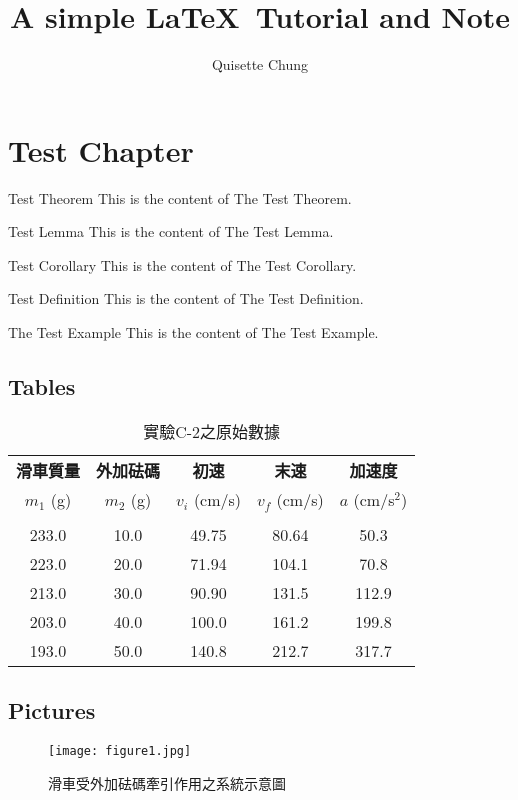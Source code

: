 \documentclass[11pt,a4paper]{report}
\title{A simple \LaTeX\ Tutorial and Note}
\author{Quisette Chung}
\begin{document}
	\maketitle
	\tableofcontents
	\chapter{Test Chapter}
		\begin{Thm}{Test Theorem}{}
			This is the content of The Test Theorem.
		\end{Thm}
		\begin{Lem}{Test Lemma}{}
			This is the content of The Test Lemma.
		\end{Lem}
		\begin{Cor}{Test Corollary}{}
			This is the content of The Test Corollary.
		\end{Cor}
		\begin{Def}{Test Definition}{}
			This is the content of The Test Definition.
		\end{Def}
		\begin{Exp}{The Test Example}{}
		 This is the content of The Test Example.
		\end{Exp}
	\section{Tables}
		\begin{table}[H]
			\caption{實驗C-2之原始數據}
			\centering
			\begin{tabular}[c]{ccccc}
				
				\textbf{滑車質量}& \textbf{外加砝碼} & \textbf{初速}& \textbf{末速} & \textbf{加速度}  \\
				$m_1$ (g)  &  $m_2$ (g)&$v_i$ (cm/s) & $v_f$ (cm/s) & $a$ (cm/s$^2$)\\
				\hline \\
				233.0 & 10.0& 49.75&80.64 &  50.3\\							
				223.0 & 20.0& 71.94&104.1 & 70.8 \\
				213.0 & 30.0& 90.90& 131.5&  112.9 \\
				203.0 & 40.0&100.0 &161.2 & 199.8 \\
				193.0 & 50.0& 140.8&212.7 & 317.7 \\
			\end{tabular}
		\end{table}
	
	\section{Pictures}
		\begin{figure}[H]
			\centering 
			\texttt{[image: figure1.jpg]}
			\caption{滑車受外加砝碼牽引作用之系統示意圖\cite{ref1}}
		\end{figure}
\end{document}
